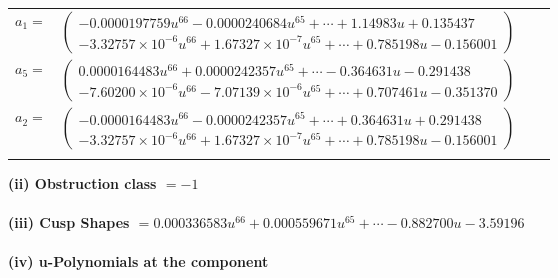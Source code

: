 \documentclass[1p]{elsarticle_modified}
\theoremstyle{definition}
\begin{document}
\begin{tabular}{m{7pt} m{180pt} m{7pt} m{180pt} }
\flushright $a_{1}=$&$\begin{pmatrix}-0.0000197759 u^{66}-0.0000240684 u^{65}+\cdots+1.14983 u+0.135437\\-3.32757\times10^{-6} u^{66}+1.67327\times10^{-7} u^{65}+\cdots+0.785198 u-0.156001\end{pmatrix}$ \\
\flushright $a_{5}=$&$\begin{pmatrix}0.0000164483 u^{66}+0.0000242357 u^{65}+\cdots-0.364631 u-0.291438\\-7.60200\times10^{-6} u^{66}-7.07139\times10^{-6} u^{65}+\cdots+0.707461 u-0.351370\end{pmatrix}$ \\
\flushright $a_{2}=$&$\begin{pmatrix}-0.0000164483 u^{66}-0.0000242357 u^{65}+\cdots+0.364631 u+0.291438\\-3.32757\times10^{-6} u^{66}+1.67327\times10^{-7} u^{65}+\cdots+0.785198 u-0.156001\end{pmatrix}$\\&\end{tabular}
\flushleft \textbf{(ii) Obstruction class $= -1$}\\~\\
\flushleft \textbf{(iii) Cusp Shapes $= 0.000336583 u^{66}+0.000559671 u^{65}+\cdots-0.882700 u-3.59196$}\\~\\
\newpage\renewcommand{\arraystretch}{1}
\flushleft \textbf{(iv) u-Polynomials at the component}\newline \\
\end{document}
